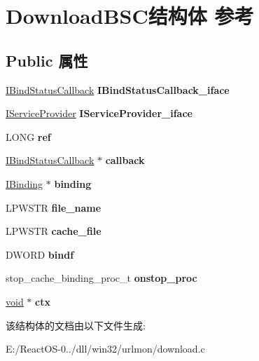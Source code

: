 \hypertarget{struct_download_b_s_c}{}\section{Download\+B\+S\+C结构体 参考}
\label{struct_download_b_s_c}
\subsection*{Public 属性}
\begin{DoxyCompactItemize}
\item 
\mbox{\label{struct_download_b_s_c_a01b668ff0aabc507cda2bab603f27824}} 
\hyperlink{interface_i_bind_status_callback}{I\+Bind\+Status\+Callback} {\bfseries I\+Bind\+Status\+Callback\+\_\+iface}
\item 
\mbox{\label{struct_download_b_s_c_a642f1b574203478badf5eb7e76912cbc}} 
\hyperlink{interface_i_service_provider}{I\+Service\+Provider} {\bfseries I\+Service\+Provider\+\_\+iface}
\item 
\mbox{\label{struct_download_b_s_c_a3d8e609b7f8ac02d003f31763db57b40}} 
L\+O\+NG {\bfseries ref}
\item 
\mbox{\label{struct_download_b_s_c_aa6cf24737b35344ed790619602303601}} 
\hyperlink{interface_i_bind_status_callback}{I\+Bind\+Status\+Callback} $\ast$ {\bfseries callback}
\item 
\mbox{\label{struct_download_b_s_c_a5300259a6941946494c8b6fa1e99d052}} 
\hyperlink{interface_i_binding}{I\+Binding} $\ast$ {\bfseries binding}
\item 
\mbox{\label{struct_download_b_s_c_a29183083b0cc2102eef5c3afe520a9ae}} 
L\+P\+W\+S\+TR {\bfseries file\+\_\+name}
\item 
\mbox{\label{struct_download_b_s_c_a4cda8535d2f54c0b8749be4eaecc172c}} 
L\+P\+W\+S\+TR {\bfseries cache\+\_\+file}
\item 
\mbox{\label{struct_download_b_s_c_a332b8e5d6ab70ad6d034915d26c28de4}} 
D\+W\+O\+RD {\bfseries bindf}
\item 
\mbox{\label{struct_download_b_s_c_a13ffbe7edf8719e97b52be524e4932cc}} 
stop\+\_\+cache\+\_\+binding\+\_\+proc\+\_\+t {\bfseries onstop\+\_\+proc}
\item 
\mbox{\label{struct_download_b_s_c_ae2867663f338d62b54c89dd94233aab2}} 
\hyperlink{interfacevoid}{void} $\ast$ {\bfseries ctx}
\end{DoxyCompactItemize}


该结构体的文档由以下文件生成\+:\begin{DoxyCompactItemize}
\item 
E\+:/\+React\+O\+S-\/0../dll/win32/urlmon/download.\+c\end{DoxyCompactItemize}
